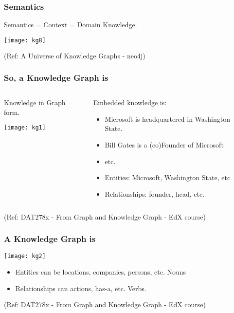 \begin{frame}[fragile]\frametitle{Semantics}
 
Semantics = Context = Domain Knowledge. 
 
			\begin{center}
			\texttt{[image: kg8]}
			\end{center}	
			
			{\tiny (Ref: A Universe of Knowledge Graphs - neo4j)}
		
	
\end{frame}

\begin{frame}\frametitle{So, a Knowledge Graph is}


\begin{columns}
    \begin{column}[T]{0.6\linewidth}

		Knowledge in Graph form.

			\begin{center}
			\texttt{[image: kg1]}
			\end{center}	
    \end{column}
    \begin{column}[T]{0.4\linewidth}
			Embedded knowledge is:
			\begin{itemize}
			\item Microsoft is headquartered in Washington State.
			\item Bill Gates is a (co)Founder of Microsoft
			\item etc.
			\item Entities: Microsoft, Washington State, etc
			\item Relationships: founder, head, etc.
			\end{itemize}
    \end{column}
  \end{columns}
	

  

{\tiny (Ref: DAT278x - From Graph and Knowledge Graph - EdX course)}
\end{frame}


\begin{frame}\frametitle{A Knowledge Graph is}

\begin{center}
\texttt{[image: kg2]}
\end{center}	

\begin{itemize}
\item Entities can be locations, companies, persons, etc. Nouns
\item Relationships can actions, has-a, etc. Verbs.
\end{itemize}


{\tiny (Ref: DAT278x - From Graph and Knowledge Graph - EdX course)}
\end{frame}

